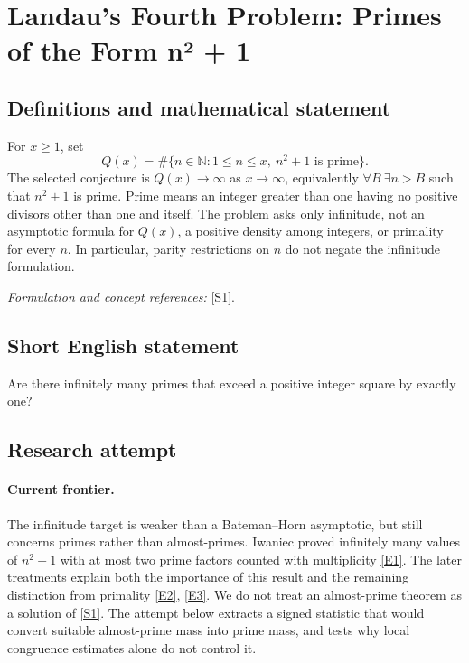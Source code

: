 \documentclass[11pt,a4paper]{article}
\newcommand{\N}{\mathbb{N}}
\newcommand{\sref}[2]{\hyperlink{source:#1:#2}{[S#2]}}
\newcommand{\eref}[2]{\hyperlink{extra:#1:#2}{[E#2]}}
\newif\ifshowcatalogue
\newcommand{\cataloguescope}[1]{\ifshowcatalogue
 \paragraph{Exact scope in the supplied catalogue.}
 \begin{quote}\small #1\end{quote}\fi}
\numberwithin{equation}{section}
\begin{document}
\setcounter{section}{0}
\clearpage
\section*{\texorpdfstring{Landau's Fourth Problem: Primes of the Form n² + 1}{Landau's Fourth Problem: Primes of the Form n² + 1}}\label{47}
\subsection{Definitions and mathematical statement}
For $x\ge1$, set
\[
 Q(x)=\#\{n\in\N:1\le n\le x,\ n^2+1\text{ is prime}\}.
\]
The selected conjecture is $Q(x)\to\infty$ as $x\to\infty$, equivalently
$\forall B\ \exists n>B$ such that $n^2+1$ is prime. Prime means an integer greater than one having no positive divisors other than one and itself. The problem asks only infinitude, not an asymptotic formula for $Q(x)$, a positive density among integers, or primality for every $n$. In particular, parity restrictions on $n$ do not negate the infinitude formulation.
\par\smallskip\textit{Formulation and concept references:} \sref{47}{1}.
\cataloguescope{Prove or disprove that there are infinitely many primes of the form n\textasciicircum{}2+1 with n a positive integer.}
\subsection{Short English statement}
Are there infinitely many primes that exceed a positive integer square by exactly one?
\subsection{Research attempt}

\paragraph{Current frontier.}
The infinitude target is weaker than a Bateman--Horn asymptotic, but still concerns primes rather than almost-primes. Iwaniec proved infinitely many values of $n^2+1$ with at most two prime factors counted with multiplicity \eref{47}{1}. The later treatments explain both the importance of this result and the remaining distinction from primality \eref{47}{2}, \eref{47}{3}. We do not treat an almost-prime theorem as a solution of \sref{47}{1}. The attempt below extracts a signed statistic that would convert suitable almost-prime mass into prime mass, and tests why local congruence estimates alone do not control it.
\end{document}
